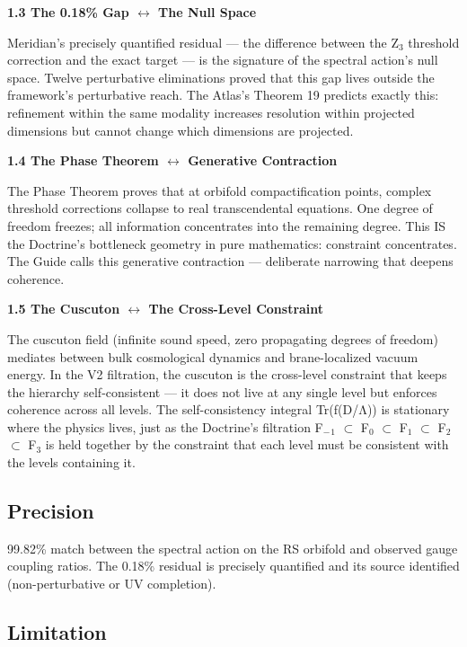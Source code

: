 \textbf{1.3 The 0.18\% Gap $\leftrightarrow$ The Null Space}


Meridian's precisely quantified residual — the difference between the Z$_3$ threshold correction and the exact target — is the signature of the spectral action's null space. Twelve perturbative eliminations proved that this gap lives outside the framework's perturbative reach. The Atlas's Theorem 19 predicts exactly this: refinement within the same modality increases resolution within projected dimensions but cannot change which dimensions are projected.


\textbf{1.4 The Phase Theorem $\leftrightarrow$ Generative Contraction}


The Phase Theorem proves that at orbifold compactification points, complex threshold corrections collapse to real transcendental equations. One degree of freedom freezes; all information concentrates into the remaining degree. This IS the Doctrine's bottleneck geometry in pure mathematics: constraint concentrates. The Guide calls this generative contraction — deliberate narrowing that deepens coherence.


\textbf{1.5 The Cuscuton $\leftrightarrow$ The Cross-Level Constraint}


The cuscuton field (infinite sound speed, zero propagating degrees of freedom) mediates between bulk cosmological dynamics and brane-localized vacuum energy. In the V2 filtration, the cuscuton is the cross-level constraint that keeps the hierarchy self-consistent — it does not live at any single level but enforces coherence across all levels. The self-consistency integral Tr(f(D/Λ)) is stationary where the physics lives, just as the Doctrine's filtration F$_{-}$$_1$ $\subset$ F$_0$ $\subset$ F$_1$ $\subset$ F$_2$ $\subset$ F$_3$ is held together by the constraint that each level must be consistent with the levels containing it.


\subsection*{Precision}


99.82\% match between the spectral action on the RS orbifold and observed gauge coupling ratios. The 0.18\% residual is precisely quantified and its source identified (non-perturbative or UV completion).


\subsection*{Limitation}


